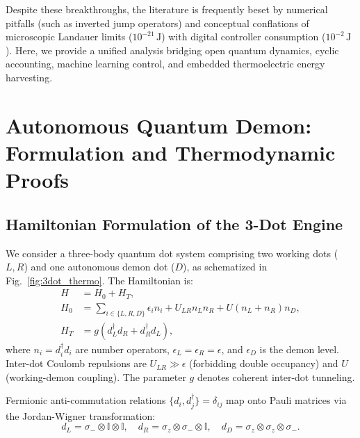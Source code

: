 \documentclass[10pt,twocolumn,a4paper]{article}
\begin{document}
Despite these breakthroughs, the literature is frequently beset by numerical pitfalls (such as inverted jump operators) and conceptual conflations of microscopic Landauer limits ($10^{-21}\,\mathrm{J}$) with digital controller consumption ($10^{-2}\,\mathrm{J}$). Here, we provide a unified analysis bridging open quantum dynamics, cyclic accounting, machine learning control, and embedded thermoelectric energy harvesting.

\section{Autonomous Quantum Demon: Formulation and Thermodynamic Proofs}

\subsection{Hamiltonian Formulation of the 3-Dot Engine}
We consider a three-body quantum dot system comprising two working dots ($L, R$) and one autonomous demon dot ($D$), as schematized in Fig.~\ref{fig:3dot_thermo}. The Hamiltonian is:
\begin{align}
H &= H_0 + H_T, \label{eq:hamiltonian} \\
H_0 &= \sum_{i \in \{L, R, D\}} \epsilon_i n_i + U_{LR} n_L n_R + U (n_L + n_R) n_D, \\
H_T &= g \left( d_L^\dagger d_R + d_R^\dagger d_L \right),
\end{align}
where $n_i = d_i^\dagger d_i$ are number operators, $\epsilon_L = \epsilon_R = \epsilon$, and $\epsilon_D$ is the demon level. Inter-dot Coulomb repulsions are $U_{LR} \gg \epsilon$ (forbidding double occupancy) and $U$ (working-demon coupling). The parameter $g$ denotes coherent inter-dot tunneling.

Fermionic anti-commutation relations $\{d_i, d_j^\dagger\} = \delta_{ij}$ map onto Pauli matrices via the Jordan-Wigner transformation:
\begin{equation}
d_L = \sigma_- \otimes \mathbb{I} \otimes \mathbb{I}, \quad
d_R = \sigma_z \otimes \sigma_- \otimes \mathbb{I}, \quad
d_D = \sigma_z \otimes \sigma_z \otimes \sigma_-.
\end{equation}
\end{document}
